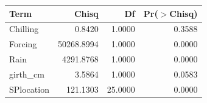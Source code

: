\begin{table}[ht]
\centering
\begin{tabular}{lrrr}
  \hline
Term & Chisq & Df & Pr($>$Chisq) \\ 
  \hline
Chilling & 0.8420 & 1.0000 & 0.3588 \\ 
  Forcing & 50268.8994 & 1.0000 & 0.0000 \\ 
  Rain & 4291.8768 & 1.0000 & 0.0000 \\ 
  girth\_cm & 3.5864 & 1.0000 & 0.0583 \\ 
  SPlocation & 121.1303 & 25.0000 & 0.0000 \\ 
   \hline
\end{tabular}
\end{table}
